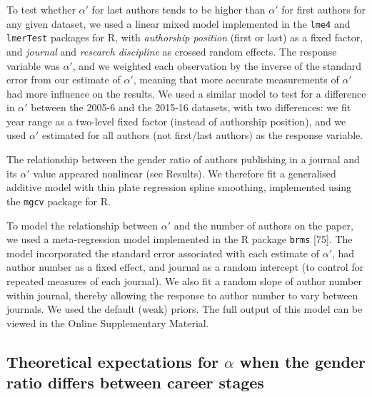 \documentclass[12pt,]{article}
\begin{document}
To test whether \(\alpha'\) for last authors tends to be higher than
\(\alpha'\) for first authors for any given dataset, we used a linear
mixed model implemented in the \texttt{lme4} and \texttt{lmerTest}
packages for R, with \emph{authorship position} (first or last) as a
fixed factor, and \emph{journal} and \emph{research discipline} as
crossed random effects. The response variable was \(\alpha'\), and we
weighted each observation by the inverse of the standard error from our
estimate of \(\alpha'\), meaning that more accurate measurements of
\(\alpha'\) had more influence on the results. We used a similar model
to test for a difference in \(\alpha'\) between the 2005-6 and the
2015-16 datasets, with two differences: we fit year range as a two-level
fixed factor (instead of authorship position), and we used \(\alpha'\)
estimated for all authors (not first/last authors) as the response
variable.

The relationship between the gender ratio of authors publishing in a
journal and its \(\alpha'\) value appeared nonlinear (see Results). We
therefore fit a generalised additive model with thin plate regression
spline smoothing, implemented using the \texttt{mgcv} package for R.

To model the relationship between \(\alpha'\) and the number of authors
on the paper, we used a meta-regression model implemented in the R
package \texttt{brms} {[}75{]}. The model incorporated the standard
error associated with each estimate of \(\alpha'\), had author number as
a fixed effect, and journal as a random intercept (to control for
repeated measures of each journal). We also fit a random slope of author
number within journal, thereby allowing the response to author number to
vary between journals. We used the default (weak) priors. The full
output of this model can be viewed in the Online Supplementary Material.

\subsection{\texorpdfstring{Theoretical expectations for \(\alpha\) when
the gender ratio differs between career
stages}{Theoretical expectations for \textbackslash{}alpha when the gender ratio differs between career stages}}\label{theoretical-expectations-for-alpha-when-the-gender-ratio-differs-between-career-stages-1}
\end{document}
